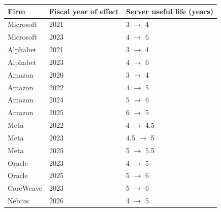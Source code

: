 \begin{tabular}{lll}
\hline
Firm & Fiscal year of effect & Server useful life (years) \\
\hline
Microsoft & 2021 & 3 $\to$ 4 \\
Microsoft & 2023 & 4 $\to$ 6 \\
Alphabet & 2021 & 3 $\to$ 4 \\
Alphabet & 2023 & 4 $\to$ 6 \\
Amazon & 2020 & 3 $\to$ 4 \\
Amazon & 2022 & 4 $\to$ 5 \\
Amazon & 2024 & 5 $\to$ 6 \\
Amazon & 2025 & 6 $\to$ 5 \\
Meta & 2022 & 4 $\to$ 4.5 \\
Meta & 2023 & 4.5 $\to$ 5 \\
Meta & 2025 & 5 $\to$ 5.5 \\
Oracle & 2023 & 4 $\to$ 5 \\
Oracle & 2025 & 5 $\to$ 6 \\
CoreWeave & 2023 & 5 $\to$ 6 \\
Nebius & 2026 & 4 $\to$ 5 \\
\hline
\end{tabular}
